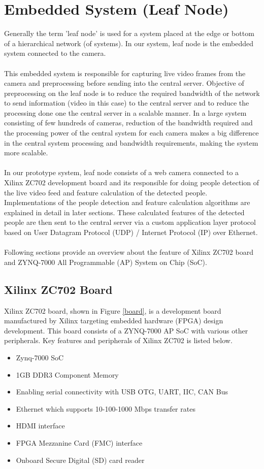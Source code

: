 \documentclass[12pt,a4paper]{report}
\begin{document}
\section{Embedded System (Leaf Node)}
Generally the term 'leaf node' is used for a system placed at the edge or bottom of a hierarchical network (of systems). In our system, leaf node is the embedded system connected to the camera.  \\\\
This embedded system  is responsible for capturing live video frames from the camera and preprocessing before sending into the central server. Objective of preprocessing on the leaf node is to reduce the required bandwidth of the network to send information (video in this case) to the central server and to reduce the processing done one the central server in a scalable manner. 
In a large system consisting of few hundreds of cameras, reduction of the bandwidth required and the processing power of the central system for each camera makes a big difference in the central system processing and bandwidth requirements, making the system more scalable.  
\\\\
In our prototype system, leaf node consists of a web camera connected to a Xilinx ZC702 development board and its responsible for doing people detection of the live video feed and feature calculation of the detected people. Implementations of the people detection and feature calculation algorithms are explained in detail in later sections. These calculated features of the detected people are then sent to the central server via a custom application layer protocol based on User Datagram Protocol (UDP) / Internet Protocol (IP) over Ethernet.
\\\\
Following sections provide an overview about the feature of Xilinx ZC702 board and ZYNQ-7000 All Programmable (AP) System on Chip (SoC).

\subsection{Xilinx ZC702 Board}
Xilinx ZC702 board, shown in Figure \ref{board}, is a development board manufactured by Xilinx targeting embedded hardware (FPGA) design development. This board consists of a ZYNQ-7000 AP SoC with various other peripherals. Key features and peripherals of Xilinx ZC702 is listed below.




\begin{itemize}
\item Zynq-7000 SoC
\item 1GB DDR3 Component Memory
\item Enabling serial connectivity with USB OTG, UART, IIC, CAN Bus
\item Ethernet which supports 10-100-1000 Mbps transfer rates
\item HDMI interface
\item FPGA Mezzanine Card (FMC) interface
\item Onboard Secure Digital (SD) card reader
\end{itemize}
\end{document}

